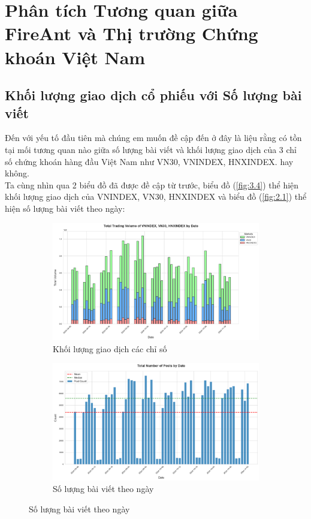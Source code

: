 \chapter{Phân tích Tương quan giữa FireAnt và Thị trường Chứng khoán Việt Nam}

\section{Khối lượng giao dịch cổ phiếu với Số lượng bài viết}

Đến với yếu tố đầu tiên mà chúng em muốn đề cập đến ở đây là liệu rằng có tồn tại mối tương quan nào giữa số lượng bài viết và khối lượng giao dịch của 3 chỉ số chứng khoán hàng đầu Việt Nam như VN30, VNINDEX, HNXINDEX. hay không.\\

Ta cùng nhìn qua 2 biểu đồ đã được đề cập từ trước, biểu đồ (\ref{fig:3.4}) thể hiện khối lượng giao dịch của VNINDEX, VN30, HNXINDEX và biểu đồ (\ref{fig:2.1}) thể hiện số lượng bài viết theo ngày:

\begin{figure}[H]
  \begin{subfigure}{.5\textwidth}
  \centering
    \includegraphics[width=1\linewidth]{images/plot-2.6-column_chart.png}
    \caption{Khối lượng giao dịch các chỉ số}
  \end{subfigure}%
  \begin{subfigure}{.5\textwidth}
  \centering
    \includegraphics[width=1\linewidth]{images/plot-2.21-column_chart.png}
    \caption{Số lượng bài viết theo ngày}
  \end{subfigure}
\end{figure}

